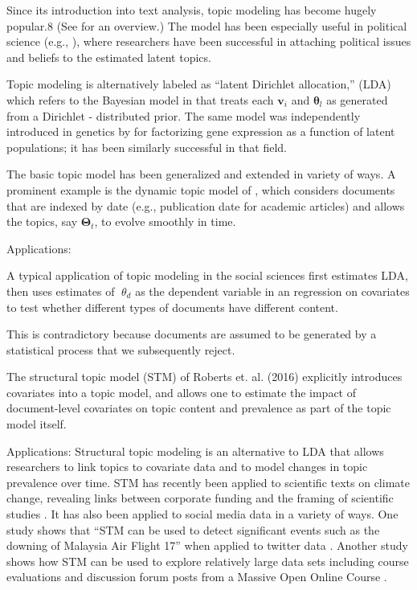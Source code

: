 \documentclass[12pt,a4paper,notitlepage]{article}
\begin{document}
Since its introduction into text analysis, topic modeling has become hugely popular.8 (See \citet{blei_probabilistic_2012} for an overview.) The model has been especially useful in political science (e.g., \citep{grimmer_bayesian_2010}), where researchers have been successful in attaching political issues and beliefs to the estimated latent topics.

Topic modeling is alternatively labeled as “latent Dirichlet allocation,” (LDA) which refers to the Bayesian model in \citet{blei_latent_2003} that treats each $\boldsymbol{v}_i$ and $\boldsymbol{\theta}_l$ as generated from a Dirichlet - distributed prior.
The same model was independently introduced in genetics by \citet{pritchard_inference_2000} for factorizing gene expression as a function of latent populations; it has been similarly successful in that field. 

The basic topic model has been generalized and extended in variety of ways. A prominent example is the dynamic topic model of \citet{blei_dynamic_2006}, which considers documents that are indexed by date (e.g., publication date for academic articles) and allows the topics, say $\boldsymbol{\Theta}_t$, to evolve smoothly in time. 

Applications:


A typical application of topic modeling in the social sciences first estimates LDA, then uses estimates of $\theta_d$ as the dependent variable in an regression on covariates to test whether different types of documents have different content. 

This is contradictory because documents are assumed to be generated by a statistical process that we subsequently reject.

The structural topic model (STM) of Roberts et. al. (2016) explicitly introduces covariates into a topic model, and allows one to estimate the impact of document-level covariates on topic content and prevalence as part of the topic model itself.

Applications:
Structural topic modeling is an alternative to LDA that allows researchers to link topics to covariate data and to model changes in topic prevalence over time. STM has recently been applied to scientific texts on climate change, revealing links between corporate funding and the framing of scientific studies \citep{farrell_corporate_2016}. It has also been applied to social media data in a variety of ways. One study shows that “STM can be used to detect significant events such as the downing of Malaysia Air Flight 17” when applied to twitter data \cite{mishler_using_2015}. Another study shows how STM can be used to explore relatively large data sets including course evaluations and discussion forum posts from a Massive Open Online Course \cite{reich_computer-assisted_2014}. 
\end{document}
